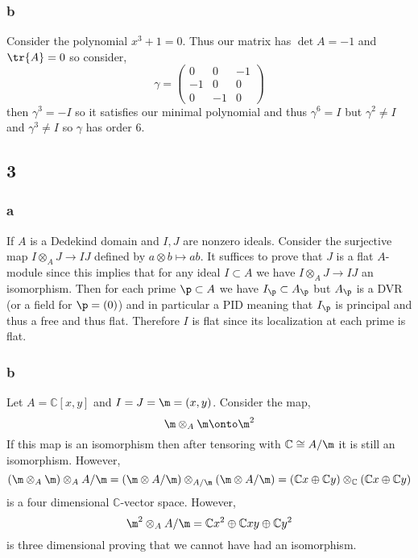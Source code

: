\documentclass[12pt]{article}
\renewcommand{\C}{\mathbb{C}}
\begin{document}
\subsubsection{b}

Consider the polynomial $x^3 + 1 = 0$. Thus our matrix has $\det{A} = -1$ and $\tr{A} = 0$ so consider,
\[ \gamma = 
\begin{pmatrix}
0 & 0 & -1
\\
-1 & 0 & 0
\\
0 & - 1 & 0
\end{pmatrix} \]
then $\gamma^3 = -I$ so it satisfies our minimal polynomial and thus $\gamma^6 = I$ but $\gamma^2 \neq I$ and $\gamma^3 \neq I$ so $\gamma$ has order $6$.

\subsection{3}

\subsubsection{a}

If $A$ is a Dedekind domain and $I,J$ are nonzero ideals. Consider the surjective map $I \otimes_A J \to IJ$ defined by $a \otimes b \mapsto ab$. It suffices to prove that $J$ is a flat $A$-module since this implies that for any ideal $I \subset A$ we have $I \otimes_A J \to IJ$ an isomorphism. Then for each prime $\p \subset A$ we have $I_\p \subset A_\p$ but $A_\p$ is a DVR (or a field for $\p = (0)$) and in particular a PID meaning that $I_\p$ is principal and thus a free and thus flat. Therefore $I$ is flat since its localization at each prime is flat.

\subsubsection{b}

Let $A = \C[x,y]$ and $I = J = \m = (x, y)$. Consider the map,
\[ \m \otimes_A \m \onto \m^2 \]
If this map is an isomorphism then after tensoring with $\C \cong A / \m$ it is still an isomorphism. However,
\[ (\m \otimes_A \m) \otimes_A A/\m = (\m \otimes A / \m) \otimes_{A / \m} (\m \otimes A / \m) = (\C x \oplus \C y) \otimes_\C (\C x \oplus \C y) \]
is a four dimensional $\C$-vector space. However,
\[ \m^2 \otimes_A A / \m = \C x^2 \oplus \C xy \oplus \C y^2 \]
is three dimensional proving that we cannot have had an isomorphism.
\end{document}
